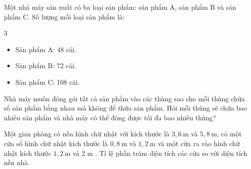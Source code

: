 \begin{bt} Một nhà máy sản xuất có ba loại sản phẩm: sản phẩm A, sản phẩm B và sản phẩm C. Số lượng mỗi loại sản phẩm là:
	\begin{multicols}{3}
		\begin{itemize}
			\item Sản phẩm A: 48 cái.
			\item Sản phẩm B: 72 cái.
			\item Sản phẩm C: 108 cái.
		\end{itemize}
	\end{multicols}
	
	Nhà máy muốn đóng gói tất cả sản phẩm vào các thùng sao cho mỗi thùng chứa số sản phẩm bằng nhau mà không để thừa sản phẩm. Hỏi mỗi thùng sẽ chứa bao nhiêu sản phẩm và nhà máy có thể đóng được tối đa bao nhiêu thùng?
\end{bt}



\begin{bt} 
	Một gian phòng có nền hình chữ nhật với kích thước là $3,6 \mathrm{~m}$ và $5,8 \mathrm{~m}$, có một cửa sổ hình chữ nhật kích thước là $0,8 \mathrm{~m}$ và $1,2 \mathrm{~m}$ và một cửa ra vào hình chữ nhật kích thước $1,2 \mathrm{~m}$ và 2 m . Tỉ lệ phần trăm diện tích các cửa so với diện tích nền nhà.
\end{bt}


